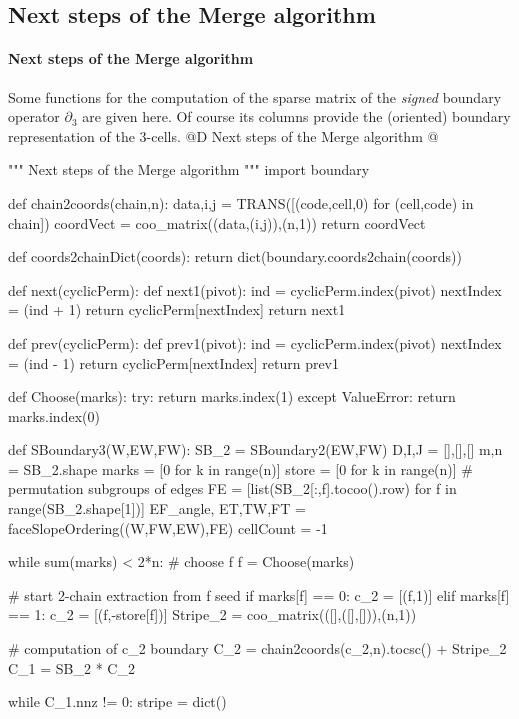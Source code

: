 \documentclass[11pt,oneside]{article}    %
\begin{document}
\subsection{Next steps of the Merge algorithm}

\paragraph{Next steps of the Merge algorithm}
Some functions for the computation of the sparse matrix of the \emph{signed} boundary operator $\partial_3$ are given here. Of course its columns provide the (oriented) boundary representation of the 3-cells.
@D Next steps of the Merge algorithm
@{""" Next steps of the Merge algorithm """  
import boundary
  
def chain2coords(chain,n):
	data,i,j = TRANS([(code,cell,0) for (cell,code) in chain])
	coordVect = coo_matrix((data,(i,j)),(n,1))
	return coordVect
	
def coords2chainDict(coords):
	return dict(boundary.coords2chain(coords))

def next(cyclicPerm):
	def next1(pivot):
		ind = cyclicPerm.index(pivot)
		nextIndex = (ind + 1) %
		return cyclicPerm[nextIndex]
	return next1

def prev(cyclicPerm):
	def prev1(pivot):
		ind = cyclicPerm.index(pivot)
		nextIndex = (ind - 1) %
		return cyclicPerm[nextIndex]
	return prev1

def Choose(marks):
	try: return marks.index(1)
	except ValueError: return marks.index(0)

def SBoundary3(W,EW,FW):
   SB_2 = SBoundary2(EW,FW)
   D,I,J = [],[],[]
   m,n = SB_2.shape
   marks = [0 for k in range(n)]
   store = [0 for k in range(n)]
   # permutation subgroups of edges
   FE = [list(SB_2[:,f].tocoo().row) for f in range(SB_2.shape[1])]
   EF_angle, ET,TW,FT = faceSlopeOrdering((W,FW,EW),FE)
   cellCount = -1

   while sum(marks) < 2*n:
      # choose f
      f = Choose(marks)
      
      # start 2-chain extraction from f seed
      if marks[f] == 0: c_2 = [(f,1)] 
      elif marks[f] == 1: c_2 = [(f,-store[f])]    
      Stripe_2 = coo_matrix(([],([],[])),(n,1))
   
      # computation of c_2 boundary
      C_2 = chain2coords(c_2,n).tocsc() + Stripe_2
      C_1 = SB_2 * C_2

      while C_1.nnz != 0:  
         stripe = dict()
         
}
\end{document}
